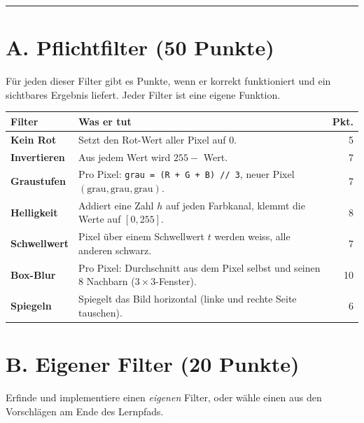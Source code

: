 \vspace{4pt}
{\color{maincolor}\rule{\textwidth}{0.4pt}}
\vspace{8pt}

\renewcommand{\arraystretch}{1.25}

\section{A. Pflichtfilter (50 Punkte)}

F\"ur jeden dieser Filter gibt es Punkte, wenn er korrekt funktioniert und
ein sichtbares Ergebnis liefert. Jeder Filter ist eine eigene Funktion.

\begin{center}
\begin{tabularx}{\textwidth}{>{\bfseries}p{4cm} X r}
\toprule
\tableheadercolor
Filter & Was er tut & Pkt. \\
\midrule
Kein Rot
  & Setzt den Rot-Wert aller Pixel auf 0.
  & 5 \\
\midrule
Invertieren
  & Aus jedem Wert wird $255 - $ Wert.
  & 7 \\
\midrule
Graustufen
  & Pro Pixel: \texttt{grau = (R + G + B) // 3}, neuer Pixel
    $(\text{grau}, \text{grau}, \text{grau})$.
  & 7 \\
\midrule
Helligkeit
  & Addiert eine Zahl $h$ auf jeden Farbkanal, klemmt die Werte
    auf $[0, 255]$.
  & 8 \\
\midrule
Schwellwert
  & Pixel \"uber einem Schwellwert $t$ werden weiss, alle anderen
    schwarz.
  & 7 \\
\midrule
Box-Blur
  & Pro Pixel: Durchschnitt aus dem Pixel selbst und seinen 8 Nachbarn
    ($3\times 3$-Fenster).
  & 10 \\
\midrule
Spiegeln
  & Spiegelt das Bild horizontal (linke und rechte Seite tauschen).
  & 6 \\
\bottomrule
\end{tabularx}
\end{center}

\section{B. Eigener Filter (20 Punkte)}

Erfinde und implementiere einen \textit{eigenen} Filter, oder w\"ahle
einen aus den Vorschl\"agen am Ende des Lernpfads.

